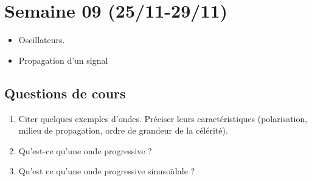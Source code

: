 \section{Semaine 09 (25/11-29/11) }


\begin{itemize}
	\item Oscillateurs.
	\item Propagation d'un signal
\end{itemize}

\subsection{Questions de cours}

\begin{enumerate}
	\item Citer quelques exemples d'ondes. Préciser leurs caractéristiques (polarisation, milieu de propagation, ordre de grandeur de la célérité).
	\item Qu'est-ce qu'une onde progressive ?
	\item Qu'est ce qu'une onde progressive sinusoïdale ?
\end{enumerate}


